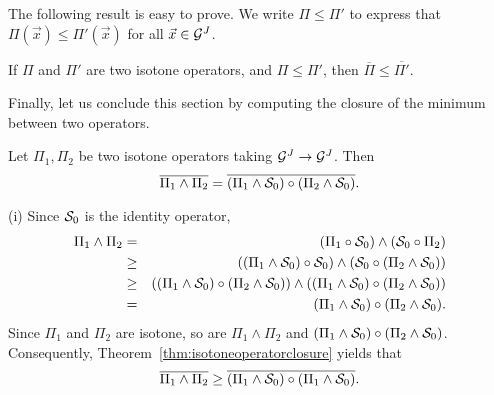 
The following result is easy to prove. We write $\Pi \leq \Pi'$ to express that $\Pi(\vec{x}) \leq
\Pi'(\vec{x})$ for all $\vec{x} \in \mathcal G^{J}$.

\begin{theorem}
If $\Pi$ and $\Pi'$ are two isotone operators, and $\Pi \leq \Pi'$, then $\overline{\Pi} \leq \overline{\Pi'}$.
\end{theorem}

Finally, let us conclude this section by computing the closure of the minimum between two operators.

\begin{theorem}
Let $\Pi_1, \Pi_2$ be two isotone operators taking $\mathcal G^J \rightarrow \mathcal G^J$. Then
\begin{equation}
\mylabel{eq:closure-min-pi1}
  \overline{\Pi_1 \wedge \Pi_2}= \overline{(\Pi_1 \wedge \calS_0) \circ (\Pi_2 \wedge \calS_0)}.
\end{equation}
\end{theorem}

\pr (i) Since $\mathcal S_0$ is the identity operator,
\begin{eqnarray*}
\Pi_1 \wedge \Pi_2 & = &  (\Pi_1 \circ \mathcal S_0) \wedge (\mathcal S_0 \circ \Pi_2) \\
          & \geq & ( (\Pi_1 \wedge \mathcal S_0) \circ \mathcal S_0) \wedge (\mathcal S_0 \circ (\Pi_2 \wedge \mathcal S_0)) \\
      & \geq & ( (\Pi_1 \wedge \mathcal S_0) \circ (\Pi_2 \wedge \mathcal S_0)) \wedge ( (\Pi_1 \wedge \mathcal S_0) \circ (\Pi_2 \wedge \mathcal S_0)) \\
        & = &  (\Pi_1 \wedge \mathcal S_0) \circ (\Pi_2 \wedge \mathcal S_0).
\end{eqnarray*}
Since $\Pi_1$ and $\Pi_2$ are isotone, so are $\Pi_1 \wedge \Pi_2$ and $(\Pi_1 \wedge \mathcal S_0) \circ (\Pi_2 \wedge \mathcal S_0)$.
Consequently, Theorem~\ref{thm:isotoneoperatorclosure} yields that
 \begin{equation}
\mylabel{eq:intermediatestepi}
 \overline{\Pi_1 \wedge \Pi_2} \geq \overline{(\Pi_1 \wedge \calS_0) \circ (\Pi_1 \wedge \calS_0)}.
\end{equation}

